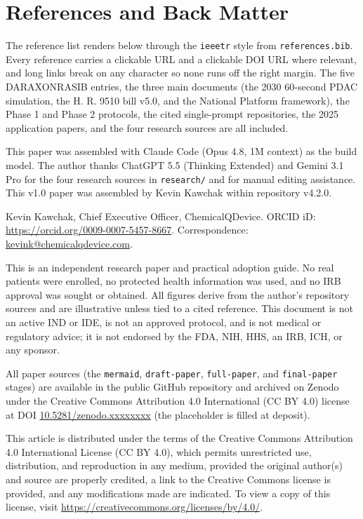 \section{References and Back Matter}

The reference list renders below through the \texttt{ieeetr} style from
\texttt{references.bib}. Every reference carries a clickable URL and a clickable DOI
URL where relevant, and long links break on any character so none runs off the
right margin. The five DARAXONRASIB entries, the three main documents (the 2030
60-second PDAC simulation, the H. R. 9510 bill v5.0, and the National Platform
framework), the Phase 1 and Phase 2 protocols, the cited single-prompt repositories,
the 2025 application papers, and the four research sources are all included.

This paper was assembled with Claude Code (Opus 4.8, 1M context) as the build model.
The author thanks ChatGPT 5.5 (Thinking Extended) and Gemini 3.1 Pro for the four
research sources in \texttt{research/} and for manual editing assistance. This v1.0
paper was assembled by Kevin Kawchak within repository v4.2.0.

Kevin Kawchak, Chief Executive Officer, ChemicalQDevice. ORCID iD:
\href{https://orcid.org/0009-0007-5457-8667}{https://orcid.org/0009-0007-5457-8667}.
Correspondence: \href{mailto:kevink@chemicalqdevice.com}{kevink@chemicalqdevice.com}.

This is an independent research paper and practical adoption guide. No real patients
were enrolled, no protected health information was used, and no IRB approval was
sought or obtained. All figures derive from the author's repository sources and are
illustrative unless tied to a cited reference. This document is not an active IND or
IDE, is not an approved protocol, and is not medical or regulatory advice; it is not
endorsed by the FDA, NIH, HHS, an IRB, ICH, or any sponsor.

All paper sources (the \texttt{mermaid}, \texttt{draft-paper}, \texttt{full-paper},
and \texttt{final-paper} stages) are available in the public GitHub repository and
archived on Zenodo under the Creative Commons Attribution 4.0 International (CC BY
4.0) license at DOI
\href{https://doi.org/10.5281/zenodo.xxxxxxxx}{10.5281/zenodo.xxxxxxxx} (the
placeholder is filled at deposit).

This article is distributed under the terms of the Creative Commons Attribution 4.0
International License (CC BY 4.0), which permits unrestricted use, distribution, and
reproduction in any medium, provided the original author(s) and source are properly
credited, a link to the Creative Commons license is provided, and any modifications
made are indicated. To view a copy of this license, visit
\url{https://creativecommons.org/licenses/by/4.0/}.

